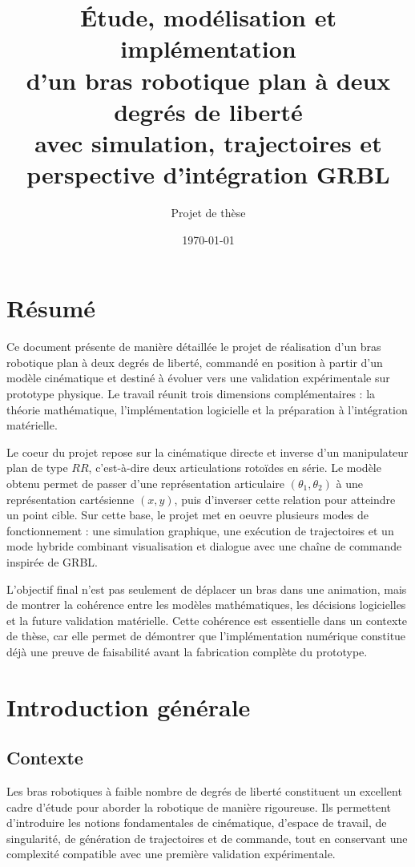 \documentclass[12pt,a4paper]{report}
\title{
    \Huge Étude, modélisation et implémentation\\[0.4em]
    d'un bras robotique plan à deux degrés de liberté\\[0.4em]
    \Large avec simulation, trajectoires et perspective d'intégration GRBL
}
\author{Projet de thèse}
\date{\today}
\newcommand{\thone}{\theta_1}
\newcommand{\thtwo}{\theta_2}
\begin{document}
\maketitle
\tableofcontents
\clearpage

\chapter*{Résumé}

Ce document présente de manière détaillée le projet de réalisation d'un bras robotique
plan à deux degrés de liberté, commandé en position à partir d'un modèle cinématique et
destiné à évoluer vers une validation expérimentale sur prototype physique. Le travail
réunit trois dimensions complémentaires : la théorie mathématique, l'implémentation
logicielle et la préparation à l'intégration matérielle.

Le coeur du projet repose sur la cinématique directe et inverse d'un manipulateur plan
de type $RR$, c'est-à-dire deux articulations rotoïdes en série. Le modèle obtenu permet
de passer d'une représentation articulaire $(\thone,\thtwo)$ à une représentation
cartésienne $(x,y)$, puis d'inverser cette relation pour atteindre un point cible.
Sur cette base, le projet met en oeuvre plusieurs modes de fonctionnement : une
simulation graphique, une exécution de trajectoires et un mode hybride combinant
visualisation et dialogue avec une chaîne de commande inspirée de GRBL.

L'objectif final n'est pas seulement de déplacer un bras dans une animation, mais de
montrer la cohérence entre les modèles mathématiques, les décisions logicielles et la
future validation matérielle. Cette cohérence est essentielle dans un contexte de thèse,
car elle permet de démontrer que l'implémentation numérique constitue déjà une preuve de
faisabilité avant la fabrication complète du prototype.

\chapter{Introduction générale}

\section{Contexte}

Les bras robotiques à faible nombre de degrés de liberté constituent un excellent cadre
d'étude pour aborder la robotique de manière rigoureuse. Ils permettent d'introduire
les notions fondamentales de cinématique, d'espace de travail, de singularité, de
génération de trajectoires et de commande, tout en conservant une complexité compatible
avec une première validation expérimentale.
\end{document}
